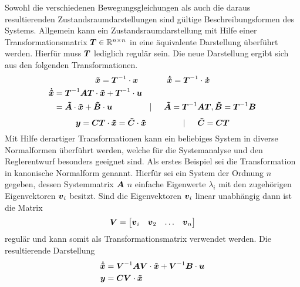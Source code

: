 Sowohl die verschiedenen Bewegungsgleichungen als auch die daraus resultierenden Zustandsraumdarstellungen sind gültige Beschreibungsformen des Systems. Allgemein kann ein Zustandsraumdarstellung mit Hilfe einer Transformationsmatrix $\boldsymbol{T} \in \mathbb{R}^{n\times n}$ in eine äquivalente Darstellung überführt werden. Hierfür muss $\boldsymbol{T}$ lediglich regulär sein. Die neue Darstellung ergibt sich aus den folgenden Transformationen.
\begin{equation}
\boldsymbol{\tilde{x}} = \boldsymbol{T}^{-1}\cdot\boldsymbol{x} \hspace{35pt}\boldsymbol{\dot{\tilde{x}}} = \boldsymbol{T}^{-1}\cdot \boldsymbol{\dot{x}}
\end{equation}
\begin{equation}
\begin{split}
\boldsymbol{\dot{\tilde{x}}} &= \boldsymbol{T}^{-1}\boldsymbol{A}\boldsymbol{T}\cdot \boldsymbol{\tilde{x}} + \boldsymbol{T}^{-1}\cdot \boldsymbol{u} \\
& = \boldsymbol{\tilde{A}}\cdot \boldsymbol{\tilde{x}} + \boldsymbol{\tilde{B}}\cdot \boldsymbol{u} \hspace{45pt} \vert \hspace{15pt} \boldsymbol{\tilde{A}} = \boldsymbol{T}^{-1}\boldsymbol{A}\boldsymbol{T}, \boldsymbol{\tilde{B}} = \boldsymbol{T}^{-1}\boldsymbol{B}
\end{split}
\end{equation}
\begin{equation}
\boldsymbol{y} = \boldsymbol{C}\boldsymbol{T}\cdot \boldsymbol{\tilde{x}} 
= \boldsymbol{\tilde{C}}\cdot \boldsymbol{\tilde{x}} \hspace{45pt} \vert \hspace{15pt} \boldsymbol{\tilde{C}} = \boldsymbol{C}\boldsymbol{T}
\end{equation}
Mit Hilfe derartiger Transformationen kann ein beliebiges System in diverse Normalformen überführt werden, welche für die Systemanalyse und den Reglerentwurf besonders geeignet sind. Als erstes Beispiel sei die Transformation in kanonische Normalform genannt. Hierfür sei ein System  der Ordnung $n$ gegeben, dessen Systemmatrix $\boldsymbol{A}$ $n$ einfache Eigenwerte $\lambda_i$ mit den zugehörigen Eigenvektoren $\boldsymbol{v}_i$ besitzt. Sind die Eigenvektoren $\boldsymbol{v}_i$ linear unabhängig dann ist die Matrix
\begin{equation}
\boldsymbol{V} = \begin{bmatrix}
\boldsymbol{v}_i & \boldsymbol{v}_2 & \hdots & \boldsymbol{v}_n 
\end{bmatrix}
\end{equation}
regulär und kann somit als Transformationsmatrix verwendet werden. Die resultierende Darstellung
\begin{equation}
\begin{split}
\boldsymbol{\dot{\tilde{x}}} &= \boldsymbol{V}^{-1}\boldsymbol{A}\boldsymbol{V}\cdot \boldsymbol{\tilde{x}} + \boldsymbol{V}^{-1}\boldsymbol{B}\cdot \boldsymbol{u} \\
\boldsymbol{y} &= \boldsymbol{C}\boldsymbol{V}\cdot \boldsymbol{\tilde{x}}
\end{split}
\end{equation}
